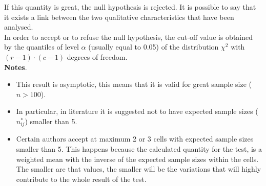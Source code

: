 \begin{frame}
  \begin{small}
    If this quantity is great, the null hypothesis is rejected. It is possible to say that it exists a link between the two qualitative characteristics that have been analysed.\\
    In order to accept or to refuse the null hypothesis, the cut-off value is obtained by the quantiles of level $ \alpha $ (usually equal to 0.05) of the distribution $ \chi^2 $ with $ (r-1) \cdot (c-1) $ degrees of freedom.\\
    \textbf{Notes}.
    \begin{itemize}
      \item This result is asymptotic, this means that it is valid for great sample size ($ n>100 $).
      \item In particular, in literature it is suggested not to have expected sample sizes ($ n_{ij}^* $) smaller than 5.\\
      \item Certain authors accept at maximum 2 or 3 cells with expected sample sizes smaller than 5. This happens because the calculated quantity for the test, is a weighted mean with the inverse of the expected sample sizes within the cells. The smaller are that values, the smaller will be the variations that will highly contribute to the whole result of the test.
    \end{itemize}
  \end{small}
\end{frame}

